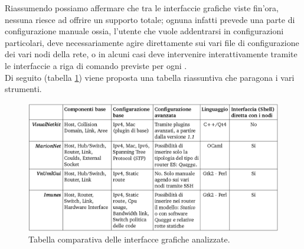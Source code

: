 Riassumendo possiamo affermare che tra le interfaccie grafiche viste fin'ora, nessuna riesce ad offrire un supporto totale; ognuna infatti prevede una parte di configurazione manuale ossia, l'utente che vuole addentrarsi in configurazioni particolari, deve necessariamente agire direttamente sui vari file di configurazione dei vari nodi della rete, o in alcuni casi deve intervenire interattivamente tramite le interfaccie a riga di comando previste per ogni \virtualmachine. \\
Di seguito (tabella \ref{figura:gui_compare}) viene proposta una tabella riassuntiva che paragona i vari strumenti.

\begin{figure}[!htb]
	\centering
	\includegraphics[width=12.7cm]{images/tabella_comparativa.png}
	\caption{Tabella comparativa delle interfacce grafiche analizzate.}
	\label{figura:gui_compare}
	
\end{figure}
